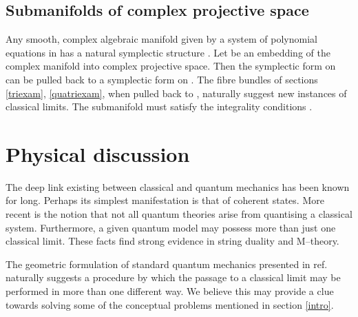 \documentclass[a4paper,a4paper]{article}
\begin{document}
\subsection{Submanifolds of complex projective space}\label{compsub}

Any smooth, complex algebraic
manifold \coordHE{} given by a system of polynomial equations in \coordHE{} has a 
natural symplectic structure \cite{ARNOLD}. Let \coordHE{} be an embedding of the complex manifold \coordHE{} into complex projective 
space. Then the symplectic form \myHighlight{$\omega$}\coordHE{} on \coordHE{} can be pulled 
back to a symplectic form \myHighlight{$\iota ^*\omega$}\coordHE{} on \coordHE{}. The fibre bundles of sections 
\ref{triexam}, \ref{quatriexam}, when pulled back to \coordHE{},
naturally suggest new instances of classical limits. The submanifold \coordHE{}
must satisfy the integrality conditions \cite{WOODHOUSE}.

\section{Physical discussion}\label{discu}

The deep link existing between classical and quantum mechanics has been known 
for long. Perhaps its simplest manifestation is that of coherent states.
More recent is the notion that not all quantum theories 
arise from quantising a classical system. Furthermore, a given quantum model may 
possess more than just one classical limit. These facts find strong evidence 
in string duality and M--theory.

The geometric formulation of standard quantum mechanics  presented in ref. \cite{ASHTEKAR}
naturally suggests a procedure by which the passage to a classical limit may be 
performed in more than one different way. We believe this may provide a clue 
towards solving some of the conceptual problems mentioned in section \ref{intro}.
\end{document}
